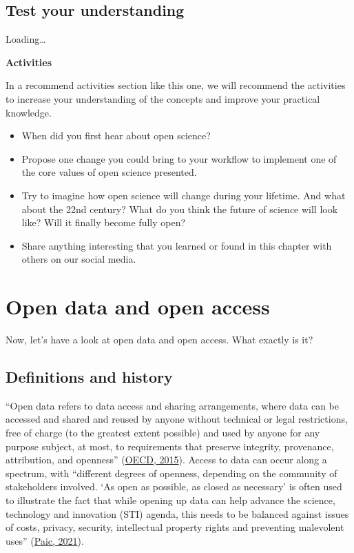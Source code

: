 \documentclass[
]{book}
\begin{document}
\hypertarget{test-your-understanding}{%
\section{Test your understanding}\label{test-your-understanding}}

Loading\ldots{}

\textbf{Activities}

In a recommend activities section like this one, we will recommend the activities to increase your understanding of the concepts and improve your practical knowledge.

\begin{itemize}
\item
  When did you first hear about open science?
\item
  Propose one change you could bring to your workflow to implement one of the core values of open science presented.
\item
  Try to imagine how open science will change during your lifetime. And what about the 22nd century? What do you think the future of science will look like? Will it finally become fully open?
\item
  Share anything interesting that you learned or found in this chapter with others on our social media.
\end{itemize}

\hypertarget{open-data-and-open-access}{%
\chapter{Open data and open access}\label{open-data-and-open-access}}

Now, let's have a look at open data and open access. What exactly is it?

\hypertarget{definitions-and-history}{%
\section{Definitions and history}\label{definitions-and-history}}

``Open data refers to data access and sharing arrangements, where data can be accessed and shared and reused by anyone without technical or legal restrictions, free of charge (to the greatest extent possible) and used by anyone for any purpose subject, at most, to requirements that preserve integrity, provenance, attribution, and openness'' (\href{https://www.oecd-ilibrary.org/science-and-technology/making-open-science-a-reality_5jrs2f963zs1-en}{OECD, 2015}). Access to data can occur along a spectrum, with ``different degrees of openness, depending on the community of stakeholders involved. `As open as possible, as closed as necessary' is often used to illustrate the fact that while opening up data can help advance the science, technology and innovation (STI) agenda, this needs to be balanced against issues of costs, privacy, security, intellectual property rights and preventing malevolent uses'' (\href{https://goingdigital.oecd.org/data/notes/No13_ToolkitNote_OpenScience.pdf}{Paic, 2021}).
\end{document}
